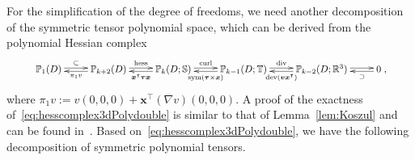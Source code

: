 For the simplification of the degree of freedoms, we need another decomposition of the symmetric tensor polynomial space, which can be derived from the polynomial Hessian complex 
\begin{equation}\label{eq:hesscomplex3dPolydouble}
\resizebox{.91\hsize}{!}{$
\xymatrix{
\mathbb P_1(D)\ar@<0.4ex>[r]^-{\subset} & \mathbb P_{k+2}(D)\ar@<0.4ex>[r]^-{\hess}\ar@<0.4ex>[l]^-{\pi_{1}v} & \mathbb P_{k}(D;\mathbb S)\ar@<0.4ex>[r]^-{\curl}\ar@<0.4ex>[l]^-{\boldsymbol x^{\intercal}\boldsymbol\tau\boldsymbol x}  & \mathbb P_{k-1}(D;\mathbb T) \ar@<0.4ex>[r]^-{{\div}}\ar@<0.4ex>[l]^-{\sym(\boldsymbol\tau\times\boldsymbol x)} & \mathbb P_{k-2}(D;\mathbb R^3)  \ar@<0.4ex>[r]^-{} \ar@<0.4ex>[l]^-{\dev(\boldsymbol v\boldsymbol x^{\intercal})}
& 0 \ar@<0.4ex>[l]^-{\supset} },
$}
\end{equation}
where $\pi_{1}v:=v(0,0,0)+\boldsymbol  x^{\intercal}(\nabla v)(0,0,0).$
A proof of the exactness of~\eqref{eq:hesscomplex3dPolydouble} is similar to that of Lemma~\ref{lem:Koszul} and can be found in~\cite{Chen;Huang:2020Discrete}. 
Based on~\eqref{eq:hesscomplex3dPolydouble}, we have the following decomposition of symmetric polynomial tensors. 



